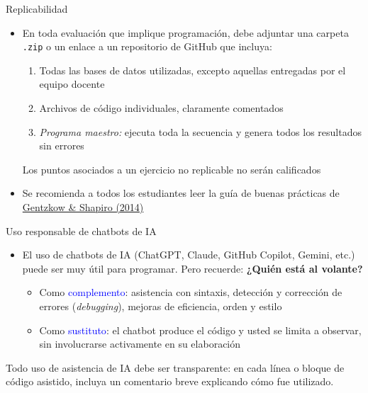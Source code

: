 \documentclass[10pt, xcolor=dvipsnames]{beamer}
\begin{document}
\begin{frame}{Replicabilidad}
\begin{itemize}
    \item En toda evaluación que implique programación, debe adjuntar una carpeta \texttt{.zip} o un enlace a un repositorio de GitHub que incluya:
    \begin{enumerate}
        \item Todas las bases de datos utilizadas, excepto aquellas entregadas por el equipo docente
        \item Archivos de código individuales, claramente comentados
        \item \textit{Programa maestro:} ejecuta toda la secuencia y genera todos los resultados sin errores
    \end{enumerate}
    \begin{tcolorbox}[colback=gray!10, title=\textbf{Nota}, breakable]
        Los puntos asociados a un ejercicio no replicable no serán calificados
    \end{tcolorbox}
    \item Se recomienda a todos los estudiantes leer la guía de buenas prácticas de \href{https://web.stanford.edu/~gentzkow/research/CodeAndData.pdf}{Gentzkow \& Shapiro (2014)} 
\end{itemize}
\end{frame}

\begin{frame}{Uso responsable de chatbots de IA}
\begin{itemize}
    \item El uso de chatbots de IA (ChatGPT, Claude, GitHub Copilot, Gemini, etc.) puede ser muy útil para programar. Pero recuerde: \textbf{¿Quién está al volante?}%
    \vspace{0.5em}
    \begin{itemize}
        \item[$\checkmark$] Como \textcolor{blue}{complemento}: asistencia con sintaxis, detección y corrección de errores (\textit{debugging}), mejoras de eficiencia, orden y estilo%
        \item[\ding{55}] Como \textcolor{blue}{sustituto}: el chatbot produce el código y usted se limita a observar, sin involucrarse activamente en su elaboración%
    \end{itemize}    
\end{itemize}
    \begin{tcolorbox}[colback=gray!10, title=\textbf{Nota}, breakable]
        Todo uso de asistencia de IA debe ser transparente: en cada línea o bloque de código asistido, incluya un comentario breve explicando cómo fue utilizado.
    \end{tcolorbox}
\end{frame}
\end{document}
